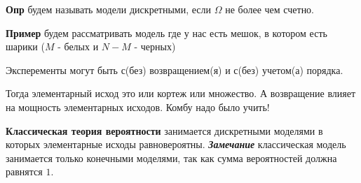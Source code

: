 \textbf{Опр} будем называть модели дискретными, если $\Omega$ не более чем счетно.

\textbf{Пример} будем рассматривать модель где у нас есть мешок, в котором есть шарики ($M$ - белых и $N - M$ - черных)

Эксперементы могут быть с(без) возвращением(я) и с(без) учетом(а) порядка.

Тогда элементарный исход это или кортеж или множество. А возвращение влияет на
мощность элементарных исходов. Комбу надо было учить!

\textbf{Классическая теория вероятности} занимается дискретными моделями в
которых элементарные исходы равновероятны. \textbf{\textit{Замечание} }классическая модель занимается только конечными моделями, так как сумма вероятностей должна равнятся $1$.

